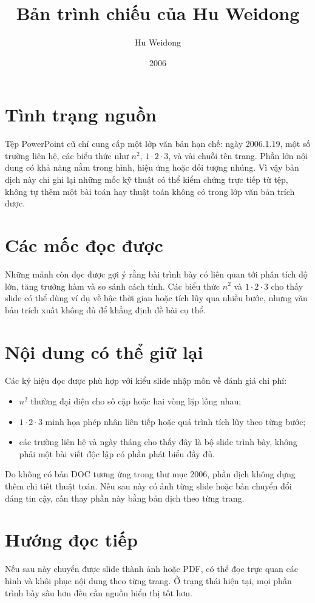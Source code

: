 \documentclass[11pt]{article}
\title{Bản trình chiếu của Hu Weidong}
\author{Hu Weidong}
\date{2006}
\begin{document}
\maketitle


\section{Tình trạng nguồn}

Tệp PowerPoint cũ chỉ cung cấp một lớp văn bản hạn chế: ngày 2006.1.19, một số
trường liên hệ, các biểu thức như \(n^2\), \(1\cdot2\cdot3\), và vài chuỗi
tên trang. Phần lớn nội dung có khả năng nằm trong hình, hiệu ứng hoặc đối
tượng nhúng. Vì vậy bản dịch này chỉ ghi lại những mốc kỹ thuật có thể kiểm
chứng trực tiếp từ tệp, không tự thêm một bài toán hay thuật toán không có
trong lớp văn bản trích được.

\section{Các mốc đọc được}

Những mảnh còn đọc được gợi ý rằng bài trình bày có liên quan tới phân tích
độ lớn, tăng trưởng hàm và so sánh cách tính. Các biểu thức \(n^2\) và
\(1\cdot2\cdot3\) cho thấy slide có thể dùng ví dụ về bậc thời gian hoặc tích
lũy qua nhiều bước, nhưng văn bản trích xuất không đủ để khẳng định đề bài cụ
thể.

\section{Nội dung có thể giữ lại}

Các ký hiệu đọc được phù hợp với kiểu slide nhập môn về đánh giá chi phí:
\begin{itemize}
  \item \(n^2\) thường đại diện cho số cặp hoặc hai vòng lặp lồng nhau;
  \item \(1\cdot2\cdot3\) minh họa phép nhân liên tiếp hoặc quá trình tích
  lũy theo từng bước;
  \item các trường liên hệ và ngày tháng cho thấy đây là bộ slide trình bày,
  không phải một bài viết độc lập có phần phát biểu đầy đủ.
\end{itemize}

Do không có bản DOC tương ứng trong thư mục 2006, phần dịch không dựng thêm
chi tiết thuật toán. Nếu sau này có ảnh từng slide hoặc bản chuyển đổi đáng
tin cậy, cần thay phần này bằng bản dịch theo từng trang.

\section{Hướng đọc tiếp}

Nếu sau này chuyển được slide thành ảnh hoặc PDF, có thể đọc trực quan các
hình và khôi phục nội dung theo từng trang. Ở trạng thái hiện tại, mọi phần
trình bày sâu hơn đều cần nguồn hiển thị tốt hơn.
\end{document}
